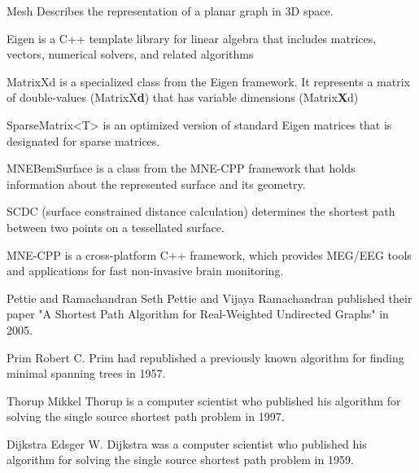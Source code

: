 \begin{aims}
	
	\item[Mesh] Describes the representation of a planar graph in 3D space.
	\item[Eigen] is a C++ template library for linear algebra that includes matrices, vectors, numerical solvers, and related algorithms
	\item[MatrixXd] is a specialized class from the Eigen framework. It represents a matrix of double-values (MatrixX\textbf{d}) that has variable dimensions (Matrix\textbf{X}d)
	\item[SparseMatrix<T>] is an optimized version of standard Eigen matrices that is designated for sparse matrices.
	\item[MNEBemSurface] is a class from the MNE-CPP framework that holds information about the represented surface and its geometry.
	\item [SCDC] (surface constrained distance calculation) determines the shortest path between two points on a tessellated surface.
	\item [MNE-CPP] is a cross-platform C++ framework, which provides MEG/EEG tools and applications for fast non-invasive brain monitoring.
	\item[Pettie and Ramachandran] Seth Pettie and Vijaya Ramachandran published their paper "A Shortest Path Algorithm for Real-Weighted Undirected Graphs" in 2005.
	\item[Prim] Robert C. Prim had republished a previously known algorithm for finding minimal spanning trees in 1957.
	\item[Thorup] Mikkel Thorup is a computer scientist who published his algorithm for solving the single source shortest path problem in 1997.
	\item[Dijkstra] Edsger W. Dijkstra was a computer scientist who published his algorithm for solving the single source shortest path problem in 1959.
\end{aims}

  

